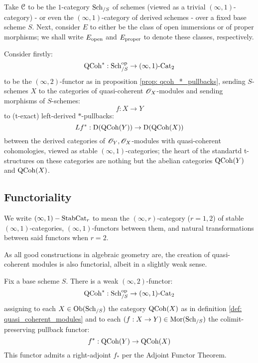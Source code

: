             \begin{example}
                Take $\mathcal{C}$ to be the $1$-category $\mathrm{Sch}_{/S}$ of schemes (viewed as a trivial $(\infty, 1)$-category) - or even the $(\infty, 1)$-category of derived schemes - over a fixed base scheme $S$. Next, consider $E$ to either be the class of open immersions or of proper morphisms; we shall write $E_{\mathrm{open}}$ and $E_{\mathrm{proper}}$ to denote these classes, respectively.

                Consider firstly:
                    $$\mathrm{QCoh}^*: \mathrm{Sch}_{/S}^{\mathrm{op}} \to (\infty, 1)\text{-}\mathrm{Cat}_2$$
                to be the $(\infty, 2)$-functor as in proposition \ref{prop: qcoh_*_pullbacks}, sending $S$-schemes $X$ to the categories of quasi-coherent $\mathscr{O}_X$-modules and sending morphisms of $S$-schemes:
                    $$f: X \to Y$$
                to (t-exact) left-derived $*$-pullbacks:
                    $$Lf^*: \mathrm{D}(\mathrm{QCoh}(Y)) \to \mathrm{D}(\mathrm{QCoh}(X))$$
                between the derived categories of $\mathscr{O}_Y, \mathscr{O}_X$-modules with quasi-coherent cohomologies, viewed as stable $(\infty, 1)$-categories; the heart of the standartd t-structures on these categories are nothing but the abelian categories $\mathrm{QCoh}(Y)$ and $\mathrm{QCoh}(X)$. 
            \end{example}

        \subsection{Functoriality}
            \begin{convention}
                We write $(\infty, 1)-\mathrm{Stab}\mathrm{Cat}_r$ to mean the $(\infty, r)$-category ($r = 1, 2$) of stable $(\infty, 1)$-categories, $(\infty, 1)$-functors between them, and natural transformations between said functors when $r = 2$.
            \end{convention}
        
            As all good constructions in algebraic geometry are, the creation of quasi-coherent modules is also functorial, albeit in a slightly weak sense. 
            \begin{proposition} \label{prop: qcoh_*_pullbacks}
                Fix a base scheme $S$. There is a weak $(\infty, 2)$-functor:
                    $$\mathrm{QCoh}^*: \mathrm{Sch}_{/S}^{\mathrm{op}} \to (\infty, 1)\text{-}\mathrm{Cat}_2$$
                assigning to each $X \in \mathrm{Ob}(\mathrm{Sch}_{/S})$ the category $\mathrm{QCoh}(X)$ as in definition \ref{def: quasi_coherent_modules} and to each $(f: X \to Y) \in \mathrm{Mor}(\mathrm{Sch}_{/S})$ the colimit-preserving pullback functor:
                    $$f^*: \mathrm{QCoh}(Y) \to \mathrm{QCoh}(X)$$
                This functor admits a right-adjoint $f_*$ per the Adjoint Functor Theorem. 
            \end{proposition}

